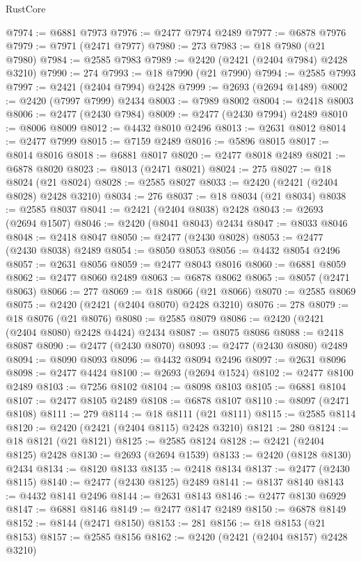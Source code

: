 \begin{lexlean}{RustCore}
\begin{coremodule}
@7974 := @6881 @7973
@7976 := @2477 @7974 @2489
@7977 := @6878 @7976
@7979 := @7971 (@2471 @7977)
@7980 := 273
@7983 := @18 @7980 (@21 @7980)
@7984 := @2585 @7983
@7989 := @2420 (@2421 (@2404 @7984) @2428 @3210)
@7990 := 274
@7993 := @18 @7990 (@21 @7990)
@7994 := @2585 @7993
@7997 := @2421 (@2404 @7994) @2428
@7999 := @2693 (@2694 @1489)
@8002 := @2420 (@7997 @7999) @2434
@8003 := @7989 @8002
@8004 := @2418 @8003
@8006 := @2477 (@2430 @7984)
@8009 := @2477 (@2430 @7994) @2489
@8010 := @8006 @8009
@8012 := @4432 @8010 @2496
@8013 := @2631 @8012
@8014 := @2477 @7999
@8015 := @7159 @2489
@8016 := @5896 @8015
@8017 := @8014 @8016
@8018 := @6881 @8017
@8020 := @2477 @8018 @2489
@8021 := @6878 @8020
@8023 := @8013 (@2471 @8021)
@8024 := 275
@8027 := @18 @8024 (@21 @8024)
@8028 := @2585 @8027
@8033 := @2420 (@2421 (@2404 @8028) @2428 @3210)
@8034 := 276
@8037 := @18 @8034 (@21 @8034)
@8038 := @2585 @8037
@8041 := @2421 (@2404 @8038) @2428
@8043 := @2693 (@2694 @1507)
@8046 := @2420 (@8041 @8043) @2434
@8047 := @8033 @8046
@8048 := @2418 @8047
@8050 := @2477 (@2430 @8028)
@8053 := @2477 (@2430 @8038) @2489
@8054 := @8050 @8053
@8056 := @4432 @8054 @2496
@8057 := @2631 @8056
@8059 := @2477 @8043 @8016
@8060 := @6881 @8059
@8062 := @2477 @8060 @2489
@8063 := @6878 @8062
@8065 := @8057 (@2471 @8063)
@8066 := 277
@8069 := @18 @8066 (@21 @8066)
@8070 := @2585 @8069
@8075 := @2420 (@2421 (@2404 @8070) @2428 @3210)
@8076 := 278
@8079 := @18 @8076 (@21 @8076)
@8080 := @2585 @8079
@8086 := @2420 (@2421 (@2404 @8080) @2428 @4424) @2434
@8087 := @8075 @8086
@8088 := @2418 @8087
@8090 := @2477 (@2430 @8070)
@8093 := @2477 (@2430 @8080) @2489
@8094 := @8090 @8093
@8096 := @4432 @8094 @2496
@8097 := @2631 @8096
@8098 := @2477 @4424
@8100 := @2693 (@2694 @1524)
@8102 := @2477 @8100 @2489
@8103 := @7256 @8102
@8104 := @8098 @8103
@8105 := @6881 @8104
@8107 := @2477 @8105 @2489
@8108 := @6878 @8107
@8110 := @8097 (@2471 @8108)
@8111 := 279
@8114 := @18 @8111 (@21 @8111)
@8115 := @2585 @8114
@8120 := @2420 (@2421 (@2404 @8115) @2428 @3210)
@8121 := 280
@8124 := @18 @8121 (@21 @8121)
@8125 := @2585 @8124
@8128 := @2421 (@2404 @8125) @2428
@8130 := @2693 (@2694 @1539)
@8133 := @2420 (@8128 @8130) @2434
@8134 := @8120 @8133
@8135 := @2418 @8134
@8137 := @2477 (@2430 @8115)
@8140 := @2477 (@2430 @8125) @2489
@8141 := @8137 @8140
@8143 := @4432 @8141 @2496
@8144 := @2631 @8143
@8146 := @2477 @8130 @6929
@8147 := @6881 @8146
@8149 := @2477 @8147 @2489
@8150 := @6878 @8149
@8152 := @8144 (@2471 @8150)
@8153 := 281
@8156 := @18 @8153 (@21 @8153)
@8157 := @2585 @8156
@8162 := @2420 (@2421 (@2404 @8157) @2428 @3210)

\end{coremodule}
\end{lexlean}
